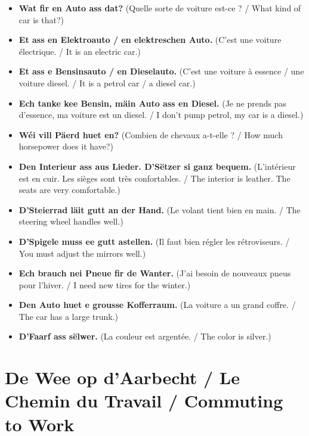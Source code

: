 \begin{itemize}
    \item \textbf{Wat fir en Auto ass dat?} (Quelle sorte de voiture est-ce ? / What kind of car is that?)
    \item \textbf{Et ass en Elektroauto / en elektreschen Auto.} (C'est une voiture électrique. / It is an electric car.)
    \item \textbf{Et ass e Bensinsauto / en Dieselauto.} (C'est une voiture à essence / une voiture diesel. / It is a petrol car / a diesel car.)
    \item \textbf{Ech tanke kee Bensin, mäin Auto ass en Diesel.} (Je ne prends pas d'essence, ma voiture est un diesel. / I don't pump petrol, my car is a diesel.)
    \item \textbf{Wéi vill Päerd huet en?} (Combien de chevaux a-t-elle ? / How much horsepower does it have?)
    \item \textbf{Den Interieur ass aus Lieder. D'Sëtzer si ganz bequem.} (L'intérieur est en cuir. Les sièges sont très confortables. / The interior is leather. The seats are very comfortable.)
    \item \textbf{D'Steierrad läit gutt an der Hand.} (Le volant tient bien en main. / The steering wheel handles well.)
    \item \textbf{D'Spigele muss ee gutt astellen.} (Il faut bien régler les rétroviseurs. / You must adjust the mirrors well.)
    \item \textbf{Ech brauch nei Pneue fir de Wanter.} (J'ai besoin de nouveaux pneus pour l'hiver. / I need new tires for the winter.)
    \item \textbf{Den Auto huet e grousse Kofferraum.} (La voiture a un grand coffre. / The car has a large trunk.)
    \item \textbf{D'Faarf ass sëlwer.} (La couleur est argentée. / The color is silver.)
\end{itemize}

\vspace{1cm}

\section{De Wee op d'Aarbecht / Le Chemin du Travail / Commuting to Work}

